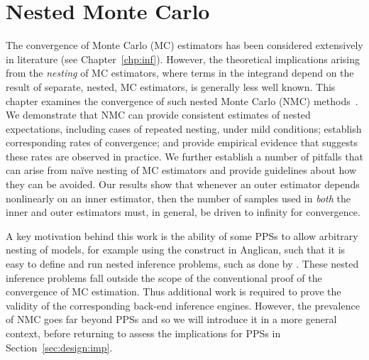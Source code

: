 
\chapter{Nested Monte Carlo}
\label{chp:nest}

The convergence of Monte Carlo (MC) estimators has been considered extensively in 
literature (see Chapter~\ref{chp:inf}).  However, the theoretical implications
arising from the \emph{nesting} of MC estimators, where terms in the integrand depend on the
result of separate, nested, MC estimators, is generally less well known.
This chapter examines the convergence of such nested Monte Carlo (NMC) 
methods~\citep{rainforth2016pitfalls,rainforth2017pitfalls}.
We demonstrate that NMC can provide consistent estimates of 
nested expectations, including cases of repeated nesting, under mild conditions;
establish corresponding rates of convergence;
and provide empirical evidence that suggests these rates are observed in practice.
We further establish a number of pitfalls that can arise from na\"{i}ve nesting of MC estimators
and provide guidelines about how they can be avoided.
Our results show that whenever an outer estimator depends nonlinearly on an inner
estimator, then the number of samples used in \emph{both} the inner and outer estimators
must, in general, be driven to infinity for convergence.  

A key motivation behind this work is the ability of some PPSs to allow
arbitrary nesting of models, for example using the \conditional construct in Anglican,
such that it is easy to define and run nested inference problems, such as done
by \citep{ouyang2016practical,le2016nested}. These nested inference problems fall outside the
scope of the conventional proof of the convergence of MC estimation. Thus additional
work is required to prove the validity of the corresponding back-end inference engines.
However, the prevalence of NMC goes far beyond PPSs and so we will introduce it in
a more general context, before returning to assess the implications for PPSs in Section~\ref{sec:design:imp}.










